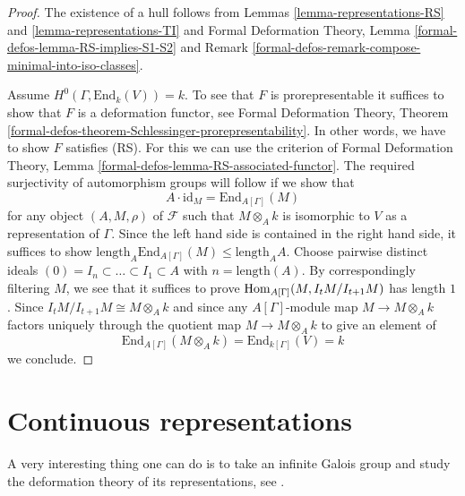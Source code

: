 \begin{proof}
The existence of a hull follows from Lemmas \ref{lemma-representations-RS} and
\ref{lemma-representations-TI} and
Formal Deformation Theory, Lemma \ref{formal-defos-lemma-RS-implies-S1-S2}
and Remark \ref{formal-defos-remark-compose-minimal-into-iso-classes}.

\medskip\noindent
Assume $H^0(\Gamma, \text{End}_k(V)) = k$. To see that $F$
is prorepresentable it suffices to show that $F$ is a
deformation functor, see Formal Deformation Theory, Theorem
\ref{formal-defos-theorem-Schlessinger-prorepresentability}.
In other words, we have to show $F$ satisfies (RS).
For this we can use the criterion of Formal Deformation Theory, Lemma
\ref{formal-defos-lemma-RS-associated-functor}.
The required surjectivity of automorphism groups will follow if we
show that
$$
A \cdot \text{id}_M =
\text{End}_{A[\Gamma]}(M)
$$
for any object $(A, M, \rho)$ of $\mathcal{F}$ such that
$M \otimes_A k$ is isomorphic to $V$ as a representation of $\Gamma$.
Since the left hand side is contained in the right hand side,
it suffices to show
$\text{length}_A \text{End}_{A[\Gamma]}(M) \leq \text{length}_A A$.
Choose pairwise distinct ideals
$(0) = I_n \subset \ldots \subset I_1 \subset A$
with $n = \text{length}(A)$. By correspondingly filtering
$M$, we see that it suffices to prove $\mathop{\mathrm{Hom}}\nolimits_{A[\Gamma]}(M, I_tM/I_{t + 1}M)$
has length $1$. Since $I_tM/I_{t + 1}M \cong M \otimes_A k$
and since any $A[\Gamma]$-module map $M \to M \otimes_A k$ factors
uniquely through the quotient map $M \to M \otimes_A k$
to give an element of
$$
\text{End}_{A[\Gamma]}(M \otimes_A k) = \text{End}_{k[\Gamma]}(V) = k
$$
we conclude.
\end{proof}



\section{Continuous representations}
\label{section-continuous-representations}

\noindent
A very interesting thing one can do is to take an infinite Galois
group and study the deformation theory of its representations, see
\cite{Mazur-deforming}.

